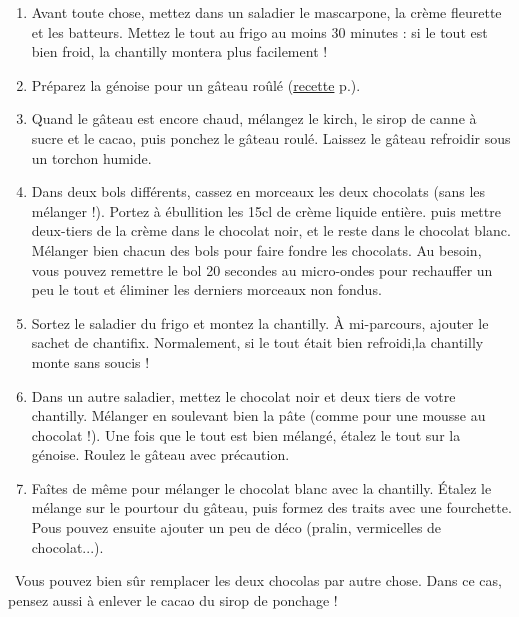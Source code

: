 {\phantom{.}
\begin{enumerate}
	\item Avant toute chose, mettez dans un saladier le mascarpone, la crème fleurette et les batteurs. Mettez le tout au frigo au moins 30 minutes : si le tout est bien froid, la chantilly montera plus facilement !
	\item Préparez la génoise pour un gâteau roûlé (\hyperref[gateauRoule]{recette} p.\pageref{gateauRoule}).
	\item Quand le gâteau est encore chaud, mélangez le kirch, le sirop de canne à sucre et le cacao, puis ponchez le gâteau roulé. Laissez le gâteau refroidir sous un torchon humide.
	\item Dans deux bols différents, cassez en morceaux les deux chocolats (sans les mélanger !). Portez à ébullition les 15cl de crème liquide entière. puis mettre deux-tiers de la crème dans le chocolat noir, et le reste dans le chocolat blanc. Mélanger bien chacun des bols pour faire fondre les chocolats. Au besoin, vous pouvez remettre le bol 20 secondes au micro-ondes pour rechauffer un peu le tout et éliminer les derniers morceaux non fondus.
	\item Sortez le saladier du frigo et montez la chantilly. À mi-parcours, ajouter le sachet de chantifix. Normalement, si le tout était bien refroidi,la chantilly monte sans soucis !
	\item Dans un autre saladier, mettez le chocolat noir et deux tiers de votre chantilly. Mélanger en soulevant bien la pâte (comme pour une mousse au chocolat !). Une fois que le tout est bien mélangé, étalez le tout sur la génoise. Roulez le gâteau avec précaution.
	\item Faîtes de même pour mélanger le chocolat blanc avec la chantilly. Étalez le mélange sur le pourtour du gâteau, puis formez des traits avec une fourchette. Pous pouvez ensuite ajouter un peu de déco (pralin, vermicelles de chocolat...).
\end{enumerate}
\bcinfo\ Vous pouvez bien sûr remplacer les deux chocolas par autre chose. Dans ce cas, pensez aussi à enlever le cacao du sirop de ponchage ! 
\phantom{.}}

